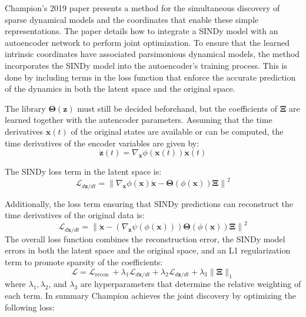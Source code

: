 Champion's 2019 paper presents a method for the simultaneous discovery of sparse dynamical models and the coordinates that enable these simple representations. The paper details how to integrate a SINDy model with an autoencoder network to perform joint optimization. To ensure that the learned intrinsic coordinates have associated parsimonious dynamical models, the method incorporates the SINDy model into the autoencoder's training process. This is done by including terms in the loss function that enforce the accurate prediction of the dynamics in both the latent space and the original space. 

The library $\mathbf\Theta(\mathbf z)$ must still be decided beforehand, but the coefficients of $\mathbf\Xi$ are learned together with the autencoder parameters. Assuming that the time derivatives $\dot{\mathbf{x}}(t)$ of the original states are available or can be computed, the time derivatives of the encoder variables are given by:
\begin{equation}
    \dot{\mathbf{z}}(t)=\nabla_{\mathbf{x}} \phi(\mathbf{x}(t)) \dot{\mathbf{x}}(t)
\end{equation}

The SINDy loss term in the latent space is:
$$
\mathcal{L}_{d \mathbf{z} / d t}=\left\|\nabla_{\mathbf{x}} \phi(\mathbf{x}) \dot{\mathbf{x}}-\boldsymbol{\Theta}(\phi(\mathbf{x})) \boldsymbol{\Xi}\right\|^2
$$

Additionally, the loss term ensuring that SINDy predictions can reconstruct the time derivatives of the original data is:
$$
\mathcal{L}_{d \mathbf{x} / d t}=\left\|\dot{\mathbf{x}}-\left(\nabla_{\mathbf{z}} \psi(\phi(\mathbf{x}))\right) \boldsymbol{\Theta}(\phi(\mathbf{x})) \boldsymbol{\Xi}\right\|^2
$$
The overall loss function combines the reconstruction error, the SINDy model errors in both the latent space and the original space, and an L1 regularization term to promote sparsity of the coefficients:
\begin{equation}
    \mathcal{L}=\mathcal{L}_{\text {recon }}+\lambda_1 \mathcal{L}_{d \mathbf{x} / d t}+\lambda_2 \mathcal{L}_{d \mathbf{z} / d t}+\lambda_3\|\mathbf{\Xi}\|_1
\end{equation}
where $\lambda_1, \lambda_2$, and $\lambda_3$ are hyperparameters that determine the relative weighting of each term. In summary Champion achieves the joint discovery by optimizing the following loss:

